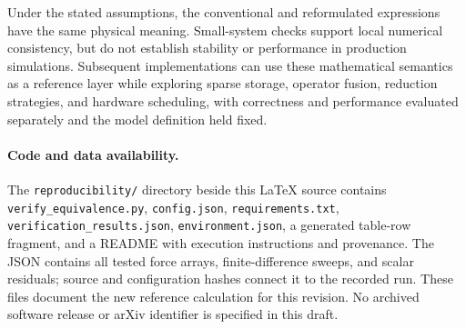\documentclass[11pt,a4paper]{article}
\theoremstyle{definition}
\begin{document}
Under the stated assumptions, the conventional and reformulated expressions have the same
physical meaning. Small-system checks support local numerical consistency, but do not establish
stability or performance in production simulations. Subsequent implementations can use these
mathematical semantics as a reference layer while exploring sparse storage, operator fusion,
reduction strategies, and hardware scheduling, with correctness and performance evaluated
separately and the model definition held fixed.

\paragraph{Code and data availability.}
The \texttt{reproducibility/} directory beside this \LaTeX{} source contains
\texttt{verify\_equivalence.py}, \texttt{config.json}, \texttt{requirements.txt},
\texttt{verification\_results.json}, \texttt{environment.json}, a generated table-row fragment,
and a README with execution instructions and provenance. The JSON contains all tested force
arrays, finite-difference sweeps, and scalar residuals; source and configuration hashes connect
it to the recorded run. These files document the new reference calculation for this revision.
No archived software release or arXiv identifier is specified in this draft.
\end{document}
